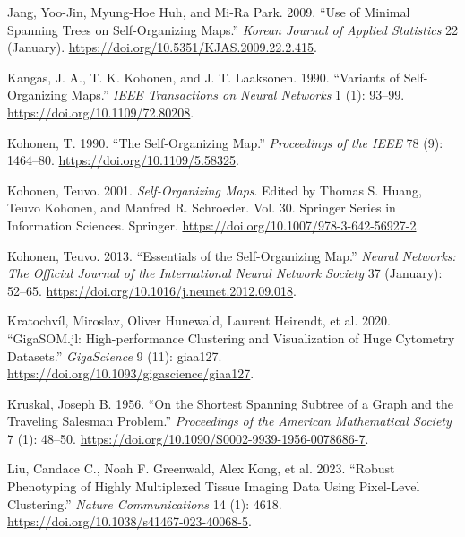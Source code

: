 \documentclass[
]{article}
\newlength{\cslhangindent}
\newenvironment{CSLReferences}[2] %
 {\begin{list}{}{%
  \setlength{\itemindent}{0pt}
  \setlength{\leftmargin}{0pt}
  \setlength{\parsep}{0pt}
  \ifodd #1
   \setlength{\leftmargin}{\cslhangindent}
   \setlength{\itemindent}{-1\cslhangindent}
  \fi
  \setlength{\itemsep}{#2\baselineskip}}}
 {\end{list}}
\begin{document}
\begin{CSLReferences}{1}{1}
Jang, Yoo-Jin, Myung-Hoe Huh, and Mi-Ra Park. 2009. {``Use of {Minimal
Spanning Trees} on {Self-Organizing Maps}.''} \emph{Korean Journal of
Applied Statistics} 22 (January).
\url{https://doi.org/10.5351/KJAS.2009.22.2.415}.

Kangas, J. A., T. K. Kohonen, and J. T. Laaksonen. 1990. {``Variants of
Self-Organizing Maps.''} \emph{IEEE Transactions on Neural Networks} 1
(1): 93--99. \url{https://doi.org/10.1109/72.80208}.

Kohonen, T. 1990. {``The Self-Organizing Map.''} \emph{Proceedings of
the IEEE} 78 (9): 1464--80. \url{https://doi.org/10.1109/5.58325}.

Kohonen, Teuvo. 2001. \emph{Self-{Organizing Maps}}. Edited by Thomas S.
Huang, Teuvo Kohonen, and Manfred R. Schroeder. Vol. 30. Springer
{Series} in {Information Sciences}. Springer.
\url{https://doi.org/10.1007/978-3-642-56927-2}.

Kohonen, Teuvo. 2013. {``Essentials of the Self-Organizing Map.''}
\emph{Neural Networks: The Official Journal of the International Neural
Network Society} 37 (January): 52--65.
\url{https://doi.org/10.1016/j.neunet.2012.09.018}.

Kratochvíl, Miroslav, Oliver Hunewald, Laurent Heirendt, et al. 2020.
{``{GigaSOM}.jl: {High-performance} Clustering and Visualization of Huge
Cytometry Datasets.''} \emph{GigaScience} 9 (11): giaa127.
\url{https://doi.org/10.1093/gigascience/giaa127}.

Kruskal, Joseph B. 1956. {``On the Shortest Spanning Subtree of a Graph
and the Traveling Salesman Problem.''} \emph{Proceedings of the American
Mathematical Society} 7 (1): 48--50.
\url{https://doi.org/10.1090/S0002-9939-1956-0078686-7}.

Liu, Candace C., Noah F. Greenwald, Alex Kong, et al. 2023. {``Robust
Phenotyping of Highly Multiplexed Tissue Imaging Data Using Pixel-Level
Clustering.''} \emph{Nature Communications} 14 (1): 4618.
\url{https://doi.org/10.1038/s41467-023-40068-5}.


\end{CSLReferences}
\end{document}
